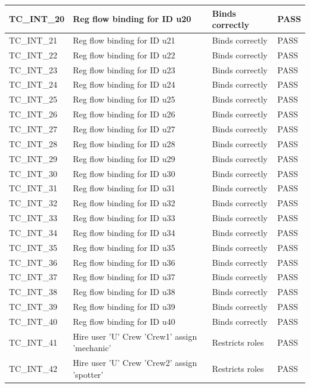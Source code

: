 \documentclass{article}
\begin{document}
\begin{longtable}{|p{2cm}|p{8cm}|p{3cm}|p{2cm}|}
\hline
TC\_INT\_20 & Reg flow binding for ID u20 & Binds correctly & PASS \\
\hline
TC\_INT\_21 & Reg flow binding for ID u21 & Binds correctly & PASS \\
\hline
TC\_INT\_22 & Reg flow binding for ID u22 & Binds correctly & PASS \\
\hline
TC\_INT\_23 & Reg flow binding for ID u23 & Binds correctly & PASS \\
\hline
TC\_INT\_24 & Reg flow binding for ID u24 & Binds correctly & PASS \\
\hline
TC\_INT\_25 & Reg flow binding for ID u25 & Binds correctly & PASS \\
\hline
TC\_INT\_26 & Reg flow binding for ID u26 & Binds correctly & PASS \\
\hline
TC\_INT\_27 & Reg flow binding for ID u27 & Binds correctly & PASS \\
\hline
TC\_INT\_28 & Reg flow binding for ID u28 & Binds correctly & PASS \\
\hline
TC\_INT\_29 & Reg flow binding for ID u29 & Binds correctly & PASS \\
\hline
TC\_INT\_30 & Reg flow binding for ID u30 & Binds correctly & PASS \\
\hline
TC\_INT\_31 & Reg flow binding for ID u31 & Binds correctly & PASS \\
\hline
TC\_INT\_32 & Reg flow binding for ID u32 & Binds correctly & PASS \\
\hline
TC\_INT\_33 & Reg flow binding for ID u33 & Binds correctly & PASS \\
\hline
TC\_INT\_34 & Reg flow binding for ID u34 & Binds correctly & PASS \\
\hline
TC\_INT\_35 & Reg flow binding for ID u35 & Binds correctly & PASS \\
\hline
TC\_INT\_36 & Reg flow binding for ID u36 & Binds correctly & PASS \\
\hline
TC\_INT\_37 & Reg flow binding for ID u37 & Binds correctly & PASS \\
\hline
TC\_INT\_38 & Reg flow binding for ID u38 & Binds correctly & PASS \\
\hline
TC\_INT\_39 & Reg flow binding for ID u39 & Binds correctly & PASS \\
\hline
TC\_INT\_40 & Reg flow binding for ID u40 & Binds correctly & PASS \\
\hline
TC\_INT\_41 & Hire user 'U' Crew 'Crew1' assign 'mechanic' & Restricts roles & PASS \\
\hline
TC\_INT\_42 & Hire user 'U' Crew 'Crew2' assign 'spotter' & Restricts roles & PASS \\

\end{longtable}
\end{document}
